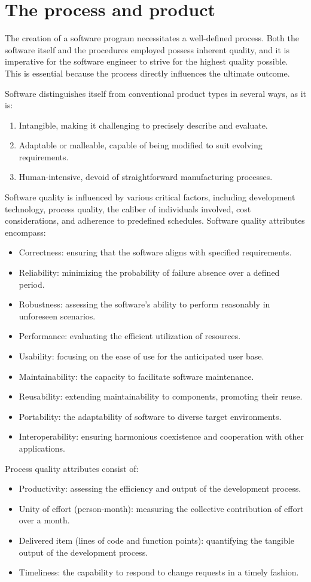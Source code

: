 \section{The process and product}

The creation of a software program necessitates a well-defined process. 
Both the software itself and the procedures employed possess inherent quality, and it is imperative for the software engineer to strive for the highest quality possible. 
This is essential because the process directly influences the ultimate outcome.

Software distinguishes itself from conventional product types in several ways, as it is:
\begin{enumerate}
    \item Intangible, making it challenging to precisely describe and evaluate.
    \item Adaptable or malleable, capable of being modified to suit evolving requirements.
    \item Human-intensive, devoid of straightforward manufacturing processes.
\end{enumerate}
Software quality is influenced by various critical factors, including development technology, process quality, the caliber of individuals involved, cost considerations, and adherence to predefined schedules. 
Software quality attributes encompass:
\begin{itemize}
    \item Correctness: ensuring that the software aligns with specified requirements.
    \item Reliability: minimizing the probability of failure absence over a defined period.
    \item Robustness: assessing the software's ability to perform reasonably in unforeseen scenarios.
    \item Performance: evaluating the efficient utilization of resources.
    \item Usability: focusing on the ease of use for the anticipated user base.
    \item Maintainability: the capacity to facilitate software maintenance.
    \item Reusability: extending maintainability to components, promoting their reuse.
    \item Portability: the adaptability of software to diverse target environments.
    \item Interoperability: ensuring harmonious coexistence and cooperation with other applications.
\end{itemize}
Process quality attributes consist of:
\begin{itemize}
    \item Productivity: assessing the efficiency and output of the development process.
    \item Unity of effort (person-month): measuring the collective contribution of effort over a month.
    \item Delivered item (lines of code and function points): quantifying the tangible output of the development process.
    \item Timeliness: the capability to respond to change requests in a timely fashion.
\end{itemize}
